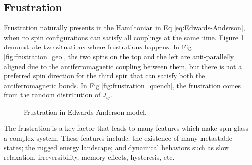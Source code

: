 \subsection{Frustration}
\label{sec:frustration}
Frustration naturally presents in the Hamiltonian in Eq \ref{eq:Edwards-Anderson}, when no spin 
configurations can satisfy all couplings at the same time. 
Figure \ref{fig:frustration} demonstrate two situations where frustrations 
happens. In Fig \ref{fig:frustration_geo}, the two spins on the top and the left
are anti-parallelly aligned due to the antiferromagnetic coupling between them,
but there is not a preferred spin direction for the third spin that can satisfy
both the antiferromagnetic bonds. In Fig \ref{fig:frustration_quench}, the 
frustration comes from the random distribution of $J_{ij}$. 

\begin{figure}
  \centering
  \hspace{0.5cm}
  \caption{Frustration in Edwards-Anderson model.}
  \label{fig:frustration}
\end{figure}

The frustration is a key factor that leads to many features which make 
spin glass a complex system.
These features include: the existence of many metastable states; the rugged energy 
landscape; and dynamical behaviors such as slow relaxation, irreversibility, 
memory effects, hysteresis, etc. 


